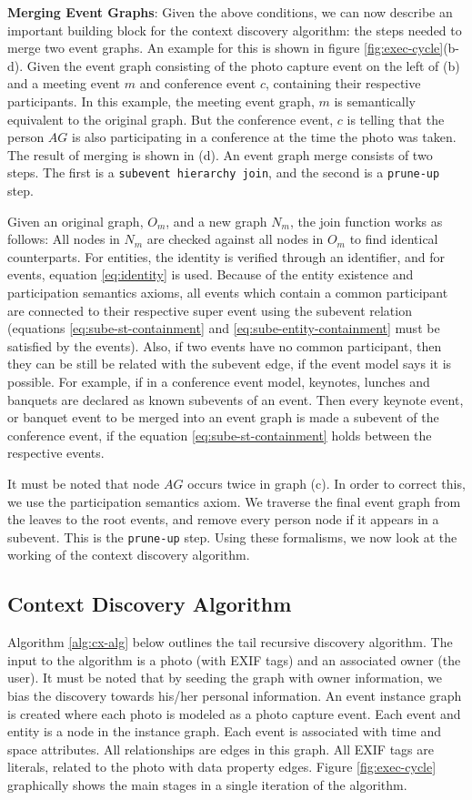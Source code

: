 \textbf{Merging Event Graphs}: Given the above conditions, we can now describe an important building block for the context discovery algorithm: the steps needed to merge two event graphs. An example for this is shown in figure \ref{fig:exec-cycle}(b-d). Given the event graph consisting of the photo capture event on the left of (b) and a meeting event $m$ and conference event $c$, containing their respective participants. In this example, the meeting event graph, $m$ is semantically equivalent to the original graph. But the conference event, $c$ is telling that the person $AG$ is also participating in a conference at the time the photo was taken. The result of merging is shown in (d). An event graph merge consists of two steps. The first is a \texttt{subevent hierarchy join}, and the second is a \texttt{prune-up} step. 

Given an original graph, $O_m$, and a new graph $N_m$, the join function works as follows: All nodes in $N_m$ are checked against all nodes in $O_m$ to find identical counterparts. For entities, the identity is verified through an identifier, and for events, equation \eqref{eq:identity} is used. Because of the entity existence and participation semantics axioms, all events which contain a common participant are connected to their respective super event using the subevent relation (equations \eqref{eq:sube-st-containment} and \eqref{eq:sube-entity-containment} must be satisfied by the events). Also, if two events have no common participant, then they can be still be related with the subevent edge, if the event model says it is possible. For example, if in a conference event model, keynotes, lunches and banquets are declared as known subevents of an event. Then every keynote event, or banquet event to be merged into an event graph is made a subevent of the conference event, if the equation \eqref{eq:sube-st-containment} holds between the respective events. 

It must be noted that node $AG$ occurs twice in graph (c). In order to correct this, we use the participation semantics axiom. We traverse the final event graph from the leaves to the root events, and remove every person node if it appears in a subevent. This is the \texttt{prune-up} step. Using these formalisms, we now look at the working of the context discovery algorithm. 

\subsection{Context Discovery Algorithm}
\label{sec:discovery-algorithm}
Algorithm \ref{alg:cx-alg} below outlines the tail recursive discovery algorithm. The input to the algorithm is a photo (with EXIF tags) and an associated owner (the user). It must be noted that by seeding the graph with owner information, we bias the discovery towards his/her personal information. An event instance graph is created where each photo is modeled as a photo capture event. Each event and entity is a node in the instance graph. Each event is associated with time and space attributes. All relationships are edges in this graph. All EXIF tags are literals, related to the photo with data property edges. Figure \ref{fig:exec-cycle} graphically shows the main stages in a single iteration of the algorithm.

